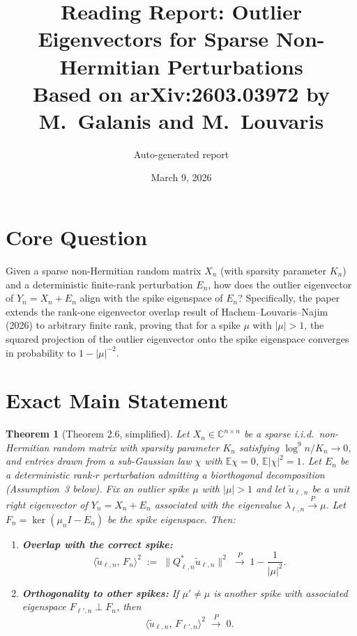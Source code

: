 \documentclass[11pt,a4paper]{article}
\title{Reading Report: Outlier Eigenvectors for Sparse Non-Hermitian Perturbations\\[6pt]
\large Based on arXiv:2603.03972 by M.\ Galanis and M.\ Louvaris}
\author{Auto-generated report}
\date{March 9, 2026}
\newtheorem{theorem}{Theorem}
\begin{document}
\maketitle

\section{Core Question}

Given a sparse non-Hermitian random matrix $X_n$ (with sparsity parameter $K_n$) and a deterministic finite-rank perturbation $E_n$, how does the outlier eigenvector of $Y_n = X_n + E_n$ align with the spike eigenspace of $E_n$?  Specifically, the paper extends the rank-one eigenvector overlap result of Hachem--Louvaris--Najim (2026) to arbitrary finite rank, proving that for a spike $\mu$ with $|\mu|>1$, the squared projection of the outlier eigenvector onto the spike eigenspace converges in probability to $1 - |\mu|^{-2}$.

\section{Exact Main Statement}

\begin{theorem}[Theorem 2.6, simplified]
Let $X_n \in \mathbb{C}^{n \times n}$ be a sparse i.i.d.\ non-Hermitian random matrix with sparsity parameter $K_n$ satisfying $\log^9 n / K_n \to 0$, and entries drawn from a sub-Gaussian law $\chi$ with $\mathbb{E}\chi=0$, $\mathbb{E}|\chi|^2=1$.  Let $E_n$ be a deterministic rank-$r$ perturbation admitting a biorthogonal decomposition (Assumption~3 below).  Fix an outlier spike $\mu$ with $|\mu|>1$ and let $\tilde{u}_{\ell,n}$ be a unit right eigenvector of $Y_n = X_n + E_n$ associated with the eigenvalue $\lambda_{\ell,n} \xrightarrow{P} \mu$.  Let $F_n = \ker(\mu_n I - E_n)$ be the spike eigenspace.  Then:
\begin{enumerate}[label=(\alph*)]
\item \textbf{Overlap with the correct spike:}
\[
\langle \tilde{u}_{\ell,n},\, F_n \rangle^2 \;:=\; \|Q_{\ell,n}^* \tilde{u}_{\ell,n}\|^2 \;\xrightarrow{\;P\;}\; 1 - \frac{1}{|\mu|^2}.
\]
\item \textbf{Orthogonality to other spikes:} If $\mu' \neq \mu$ is another spike with associated eigenspace $F_{\ell',n} \perp F_n$, then
\[
\langle \tilde{u}_{\ell,n},\, F_{\ell',n} \rangle^2 \;\xrightarrow{\;P\;}\; 0.
\]
\end{enumerate}
\end{theorem}
\end{document}
